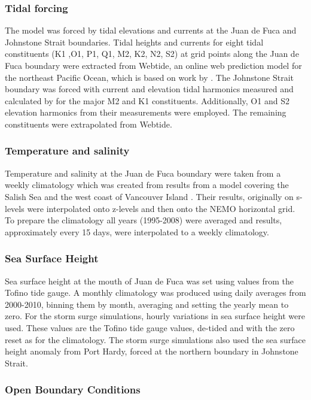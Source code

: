 \documentclass[pdftex,10pt]{article}
\begin{document}
\subsubsection{Tidal forcing} 
The model was forced by tidal elevations and currents at the Juan de Fuca and Johnstone Strait boundaries. Tidal heights and currents for eight tidal constituents (K1 ,O1, P1, Q1, M2, K2, N2, S2) at grid points along the Juan de Fuca boundary were extracted from Webtide, an online web prediction model for the northeast Pacific Ocean, which is based on work by \citet{foreman2000webtide}. The Johnstone Strait boundary was forced with current and elevation tidal harmonics measured and calculated by \citet{thomson1980johnstone} for the major M2 and K1 constituents. Additionally, O1 and S2 elevation harmonics from their measurements were employed. The remaining constituents were extrapolated from Webtide. 

\subsubsection{Temperature and salinity}
Temperature and salinity at the Juan de Fuca boundary were taken from a weekly climatology which was created from results from a model covering the Salish Sea and the west coast of Vancouver Island \citep{massonfine2012}.  Their results, originally on s-levels were interpolated onto z-levels and then onto the NEMO horizontal grid.  To prepare the climatology all years (1995-2008) were averaged and results, approximately every 15 days, were interpolated to a weekly climatology.

\subsubsection{Sea Surface Height}
Sea surface height at the mouth of Juan de Fuca was set using values from the Tofino tide gauge.  A monthly climatology was produced using daily averages from 2000-2010, binning them by month, averaging and setting the yearly mean to zero.  For the storm surge simulations, hourly variations in sea surface height were used.  These values are the Tofino tide gauge values, de-tided and with the zero reset as for the climatology. The storm surge simulations also used the sea surface height anomaly from Port Hardy, forced at the northern boundary in Johnstone Strait. 

\subsubsection{Open Boundary Conditions}
\end{document}
